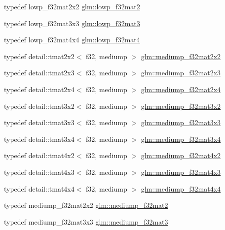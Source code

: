 \begin{CompactItemize}
\item 
typedef lowp\_\-f32mat2x2 \hyperlink{group__gtc__type__precision_gd717448ef1129d7b795ebcfee6c4944c}{glm::lowp\_\-f32mat2}
\item 
typedef lowp\_\-f32mat3x3 \hyperlink{group__gtc__type__precision_g84500ab23c0f0f3c585f8ad02f33b88c}{glm::lowp\_\-f32mat3}
\item 
typedef lowp\_\-f32mat4x4 \hyperlink{group__gtc__type__precision_gda4d11f44b410c1be7b6b1d05ccf692c}{glm::lowp\_\-f32mat4}
\item 
typedef detail::tmat2x2$<$ f32, mediump $>$ \hyperlink{group__gtc__type__precision_g23c9239d6aa9b41c3d2145e2faa81edb}{glm::mediump\_\-f32mat2x2}
\item 
typedef detail::tmat2x3$<$ f32, mediump $>$ \hyperlink{group__gtc__type__precision_g42497d19668931d225bccf1b9c614c19}{glm::mediump\_\-f32mat2x3}
\item 
typedef detail::tmat2x4$<$ f32, mediump $>$ \hyperlink{group__gtc__type__precision_g20c5b3b715b70f1c09f7f95bfaa7aa84}{glm::mediump\_\-f32mat2x4}
\item 
typedef detail::tmat3x2$<$ f32, mediump $>$ \hyperlink{group__gtc__type__precision_g9762d48bb9b41e3cf40f6e616cf61b6b}{glm::mediump\_\-f32mat3x2}
\item 
typedef detail::tmat3x3$<$ f32, mediump $>$ \hyperlink{group__gtc__type__precision_gd4d01189a1462366b143c5cbc3de0ea9}{glm::mediump\_\-f32mat3x3}
\item 
typedef detail::tmat3x4$<$ f32, mediump $>$ \hyperlink{group__gtc__type__precision_g7ad59b967576d930f4c8aa7b8c48e1af}{glm::mediump\_\-f32mat3x4}
\item 
typedef detail::tmat4x2$<$ f32, mediump $>$ \hyperlink{group__gtc__type__precision_g3400d5463f0a58cf3959406aa2b69f72}{glm::mediump\_\-f32mat4x2}
\item 
typedef detail::tmat4x3$<$ f32, mediump $>$ \hyperlink{group__gtc__type__precision_g31635d753ab8a19fdaa80d2b89e90c54}{glm::mediump\_\-f32mat4x3}
\item 
typedef detail::tmat4x4$<$ f32, mediump $>$ \hyperlink{group__gtc__type__precision_g8f83086fffe71f9cd15e75a1de101ba6}{glm::mediump\_\-f32mat4x4}
\item 
typedef mediump\_\-f32mat2x2 \hyperlink{group__gtc__type__precision_g103735a38477f7c389b36aae0fbdf274}{glm::mediump\_\-f32mat2}
\item 
typedef mediump\_\-f32mat3x3 \hyperlink{group__gtc__type__precision_ge263a08ef179894fdd36f9a51698c4ab}{glm::mediump\_\-f32mat3}
\item 

\end{CompactItemize}
